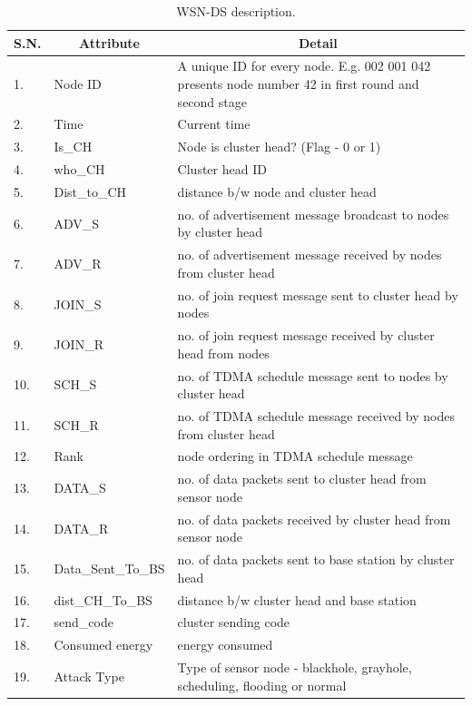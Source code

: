 \begin{longtable}[c]{|p{0.5in}|p{1.5in}|p{3.5in}|}
\caption{WSN-DS description.}
\label{tab:WSNDS}\\
\hline
\multicolumn{1}{|c|}{\textbf{S.N.}} & \multicolumn{1}{c|}{\textbf{Attribute}} & \multicolumn{1}{c|}{\textbf{Detail}} \\ \hline
\endfirsthead
%
\endhead
%
1. & Node ID & A unique ID for every node. E.g. 002 001 042 presents node number 42 in first round and second stage \\ \hline
2. & Time & Current time \\ \hline
3. & Is\_CH & Node is cluster head? (Flag - 0 or 1) \\ \hline
4. & who\_CH & Cluster head ID \\ \hline
5. & Dist\_to\_CH & distance b/w node and cluster head \\ \hline
6. & ADV\_S & no. of advertisement message broadcast to nodes by cluster head \\ \hline
7. & ADV\_R & no. of advertisement message received by nodes from cluster head \\ \hline
8. & JOIN\_S & no. of join request message sent to cluster head by nodes \\ \hline
9. & JOIN\_R & no. of join request message received by cluster head from nodes \\ \hline
10. & SCH\_S & no. of TDMA schedule message sent to nodes by cluster head \\ \hline
11. & SCH\_R & no. of TDMA schedule message received by nodes from cluster head \\ \hline
12. & Rank & node ordering in TDMA schedule message \\ \hline
13. & DATA\_S & no. of data packets sent to cluster head from sensor node \\ \hline
14. & DATA\_R & no. of data packets received by cluster head from sensor node \\ \hline
15. & Data\_Sent\_To\_BS & no. of data packets sent to base station by cluster head \\ \hline
16. & dist\_CH\_To\_BS & distance b/w cluster head and base station \\ \hline
17. & send\_code & cluster sending code \\ \hline
18. & Consumed energy & energy consumed \\ \hline
19. & Attack Type & Type of sensor node - blackhole, grayhole, scheduling, flooding or normal \\ \hline
\end{longtable}



